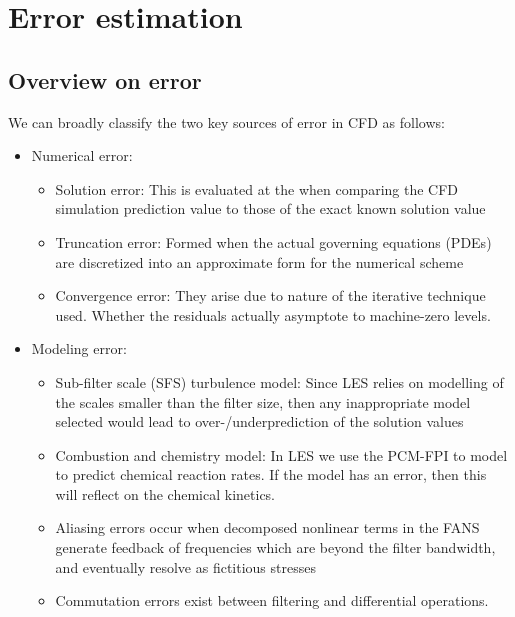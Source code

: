 \section{Error estimation}

\subsection{Overview on error}
We can broadly classify the two key sources of error in CFD as follows:

\begin{itemize}
\item Numerical error:
	\begin{itemize}
	\item Solution error:
	This is evaluated at the when comparing the CFD simulation prediction value to those of the exact known solution value
	\item Truncation error:
	Formed when the actual governing equations (PDEs) are discretized into an approximate form for the numerical scheme
	\item Convergence error:
	They arise due to nature of the iterative technique used. Whether the residuals actually asymptote to machine-zero levels.
	\end{itemize}
\item Modeling error:
\begin{itemize}
	\item Sub-filter scale (SFS) turbulence model: 
		Since LES relies on modelling of the scales smaller than the filter size, then any inappropriate model selected would lead to over-/underprediction of the solution values
	\item Combustion and chemistry model:
		In LES we use the PCM-FPI to model to predict chemical reaction rates. If the model has an error, then this will reflect on the chemical kinetics.
    \item Aliasing errors occur when decomposed nonlinear terms in the FANS generate feedback of frequencies which are beyond the filter bandwidth, and eventually resolve as fictitious stresses
     \item Commutation errors exist between filtering and differential operations.
\end{itemize}
\end{itemize}
	
	
